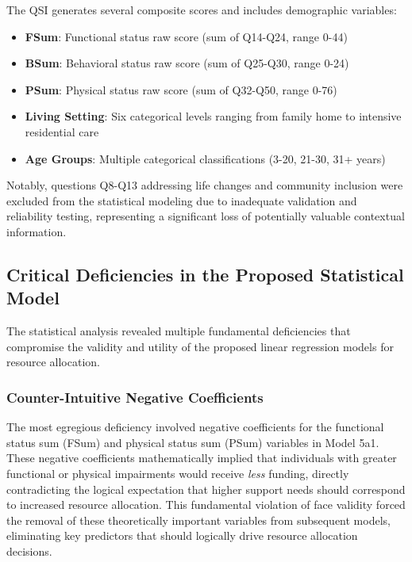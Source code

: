 \documentclass[12pt]{article}
\begin{document}
The QSI generates several composite scores and includes demographic variables:

\begin{itemize}
    \item \textbf{FSum}: Functional status raw score (sum of Q14-Q24, range 0-44)
    \item \textbf{BSum}: Behavioral status raw score (sum of Q25-Q30, range 0-24)
    \item \textbf{PSum}: Physical status raw score (sum of Q32-Q50, range 0-76)
    \item \textbf{Living Setting}: Six categorical levels ranging from family home to intensive residential care
    \item \textbf{Age Groups}: Multiple categorical classifications (3-20, 21-30, 31+ years)
\end{itemize}

Notably, questions Q8-Q13 addressing life changes and community inclusion were excluded from the statistical modeling due to inadequate validation and reliability testing, representing a significant loss of potentially valuable contextual information.

\subsection{Critical Deficiencies in the Proposed Statistical Model}

The statistical analysis revealed multiple fundamental deficiencies that compromise the validity and utility of the proposed linear regression models for resource allocation.

\subsubsection{Counter-Intuitive Negative Coefficients}

The most egregious deficiency involved negative coefficients for the functional status sum (FSum) and physical status sum (PSum) variables in Model 5a1. These negative coefficients mathematically implied that individuals with greater functional or physical impairments would receive \textit{less} funding, directly contradicting the logical expectation that higher support needs should correspond to increased resource allocation. This fundamental violation of face validity forced the removal of these theoretically important variables from subsequent models, eliminating key predictors that should logically drive resource allocation decisions.
\end{document}
